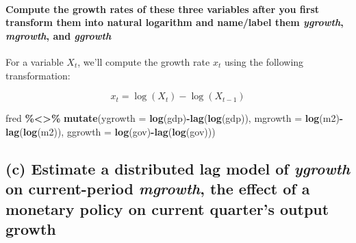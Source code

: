 \documentclass[
]{article}
\newenvironment{Shaded}{\begin{snugshade}}{\end{snugshade}}
\newcommand{\AttributeTok}[1]{\textcolor[rgb]{0.13,0.29,0.53}{#1}}
\newcommand{\FunctionTok}[1]{\textcolor[rgb]{0.13,0.29,0.53}{\textbf{#1}}}
\newcommand{\NormalTok}[1]{#1}
\newcommand{\SpecialCharTok}[1]{\textcolor[rgb]{0.81,0.36,0.00}{\textbf{#1}}}
\begin{document}
\hypertarget{compute-the-growth-rates-of-these-three-variables-after-you-first-transform-them-into-natural-logarithm-and-namelabel-them-ygrowth-mgrowth-and-ggrowth}{%
\paragraph{\texorpdfstring{Compute the growth rates of these three
variables after you first transform them into natural logarithm and
name/label them \emph{ygrowth}, \emph{mgrowth}, and
\emph{ggrowth}}{Compute the growth rates of these three variables after you first transform them into natural logarithm and name/label them ygrowth, mgrowth, and ggrowth}}\label{compute-the-growth-rates-of-these-three-variables-after-you-first-transform-them-into-natural-logarithm-and-namelabel-them-ygrowth-mgrowth-and-ggrowth}}

For a variable \(X_t\), we'll compute the growth rate \(x_t\) using the
following transformation:

\[
x_t = \log(X_t)-\log(X_{t-1})
\]

\begin{Shaded}
\begin{Highlighting}[]
\NormalTok{fred }\SpecialCharTok{\%\textless{}\textgreater{}\%} \FunctionTok{mutate}\NormalTok{(}\AttributeTok{ygrowth =} \FunctionTok{log}\NormalTok{(gdp)}\SpecialCharTok{{-}}\FunctionTok{lag}\NormalTok{(}\FunctionTok{log}\NormalTok{(gdp)),}
                 \AttributeTok{mgrowth =} \FunctionTok{log}\NormalTok{(m2)}\SpecialCharTok{{-}}\FunctionTok{lag}\NormalTok{(}\FunctionTok{log}\NormalTok{(m2)),}
                 \AttributeTok{ggrowth =} \FunctionTok{log}\NormalTok{(gov)}\SpecialCharTok{{-}}\FunctionTok{lag}\NormalTok{(}\FunctionTok{log}\NormalTok{(gov)))}
\end{Highlighting}
\end{Shaded}

\hypertarget{c-estimate-a-distributed-lag-model-of-ygrowth-on-current-period-mgrowth-the-effect-of-a-monetary-policy-on-current-quarters-output-growth}{%
\subsection{\texorpdfstring{(c) Estimate a distributed lag model of
\emph{ygrowth} on current-period \emph{mgrowth}, the effect of a
monetary policy on current quarter's output
growth}{(c) Estimate a distributed lag model of ygrowth on current-period mgrowth, the effect of a monetary policy on current quarter's output growth}}\label{c-estimate-a-distributed-lag-model-of-ygrowth-on-current-period-mgrowth-the-effect-of-a-monetary-policy-on-current-quarters-output-growth}}
\end{document}
